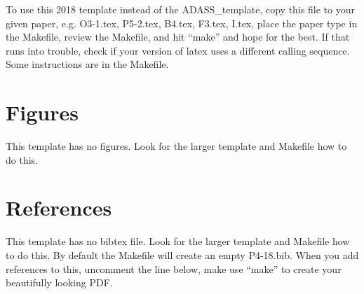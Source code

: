\documentclass[11pt,twoside]{article}
\begin{document}
To use this 2018 template instead of the ADASS\_template, copy this file to your given paper, e.g. O3-1.tex, P5-2.tex, B4.tex, F3.tex, I.tex, place the
paper type in the Makefile, review the Makefile, and hit ``make'' and hope for the best.  If that runs into trouble, check if your version of
latex uses a different calling sequence.  Some instructions are in the Makefile.

\section{Figures}

This template has no figures.
Look for the larger template and Makefile how to do this.

\section{References}

This template has no bibtex file. 
Look for the larger template and Makefile how to do this. By default the Makefile will create
an empty P4-18.bib. When you add references to this, uncomment  the 
line \verb++  below, make use ``make'' to
create your beautifully looking PDF.

% 
\end{document}
